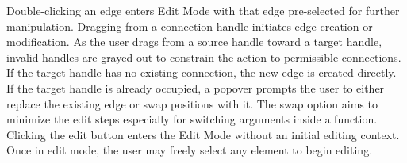 Double-clicking an edge enters Edit Mode with that edge pre-selected for further manipulation. Dragging from a connection handle initiates edge creation or modification. As the user drags from a source handle toward a target handle, invalid handles are grayed out to constrain the action to permissible connections. If the target handle has no existing connection, the new edge is created directly. If the target handle is already occupied, a popover prompts the user to either replace the existing edge or swap positions with it. The swap option aims to minimize the edit steps especially for switching arguments inside a function. Clicking the edit button enters the Edit Mode without an initial editing context. Once in edit mode, the user may freely select any element to begin editing.

